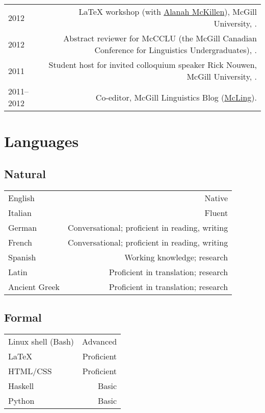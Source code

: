 \documentclass[letterpaper]{article}
\makeatletter
\newcommand{\formatdatenoday}[2]{\mydatenoday\formatdate{0}{#1}{#2}}
\newcommand{\myvrule}{\color{lightgray}\vrule width 1.0pt}
\newenvironment{cvsection}{%
  \renewcommand{\arraystretch}{1.75}
  \begin{longtable}[l]{@{} L R @{}}
}{%
  \end{longtable}
}
\makeatother
\begin{document}
\begin{cvsection}
  2012 & \LaTeX{} workshop (with
  \href{http://people.linguistics.mcgill.ca/~alanah.mckillen/}{Alanah
  McKillen}), McGill University, . \\

  2012 & Abstract reviewer for McCCLU (the McGill Canadian Conference for
  Linguistics Undergraduates), \formatdatenoday{1}{2012}. \\

  2011 & Student host for invited colloquium speaker Rick Nouwen, McGill
  University, \formatdatenoday{12}{2011}. \\

  2011--2012 & Co-editor, McGill Linguistics Blog
  (\href{https://blogs.mcgill.ca/mcling/}{McLing}). \\
\end{cvsection}



\section*{Languages}

\vspace{1ex}
\subsection*{Natural}

\begin{cvsection}
  English & Native \\
  Italian & Fluent \\
  German & Conversational; proficient in reading, writing \\
  French & Conversational; proficient in reading, writing \\
  Spanish & Working knowledge; research \\
  Latin & Proficient in translation; research \\
  Ancient Greek & Proficient in translation; research \\
\end{cvsection}

\vspace{-2ex}
\subsection*{Formal}

\begin{cvsection}
  Linux shell {\footnotesize (Bash)} & Advanced \\
  \LaTeX{} & Proficient \\
  HTML/CSS & Proficient \\
  Haskell & Basic \\
  Python & Basic \\
\end{cvsection}
\end{document}
